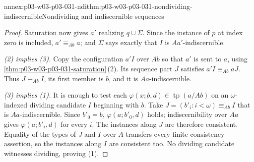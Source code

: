 \begin{annexitem}{annex:p03-w03-p03-031-ndi}{thm:p03-w03-p03-031-nondividing-indiscernible}{Nondividing and indiscernible sequences}
\begin{proof}
Saturation now gives \(a'\) realizing \(q\cup\Sigma\).  Since the
instance of \(p\) at index zero is included, \(a'\equiv_{Ab}a\); and
\(\Sigma\) says exactly that \(I\) is \(Aa'\)-indiscernible.

\emph{(2) implies (3).}  Copy the configuration \(a'I\) over \(Ab\)
so that \(a'\) is sent to \(a\), using
\cref{thm:p03-w03-p03-031-saturation}\,(2).  Its sequence part \(J\)
satisfies \(a'I\equiv_{Ab}aJ\).  Thus \(J\equiv_{Ab}I\), its first
member is \(b\), and it is \(Aa\)-indiscernible.

\emph{(3) implies (1).}  It is enough to test each
\(\varphi(x;b,d)\in\operatorname{tp}(a/Ab)\) on an
\(\omega\)-indexed dividing candidate \(I\) beginning with \(b\).
Take \(J=(b'_i:i<\omega)\equiv_{Ab}I\) that is
\(Aa\)-indiscernible.  Since \(b'_0=b\),
\(\varphi(a;b'_0,d)\) holds; indiscernibility over \(Aa\) gives
\(\varphi(a;b'_i,d)\) for every \(i\).  The instances along \(J\)
are therefore consistent.  Equality of the types of \(J\) and \(I\)
over \(A\) transfers every finite consistency assertion, so the
instances along \(I\) are consistent too.  No dividing candidate
witnesses dividing, proving (1).
\end{proof}
\end{annexitem}

